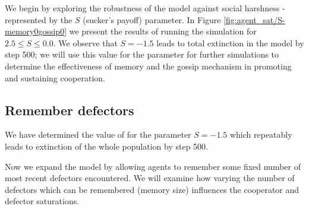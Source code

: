 \documentclass[english]{article}
\begin{document}
We begin by exploring the robustness of the model against social harshness - represented by the $S$ (sucker's payoff) parameter.
In Figure \ref{fig:agent_sat/S-memory0gossip0} we present the results of running the simulation for $2.5 \leq S \leq 0.0$.
We observe that $S = -1.5$ leads to total extinction in the model by step 500;
we will use this value for the parameter for further simulations to determine the effectiveness of memory and the gossip mechanism in promoting and sustaining cooperation.


\subsection{Remember defectors}
We have determined the value of for the parameter $S = -1.5$ which repeatably leads to extinction of the whole population by step 500.

Now we expand the model by allowing agents to remember some fixed number of most recent defectors encountered. We will examine how varying the number of defectors which can be remembered (memory size) influences the cooperator and defector saturations.
\end{document}

